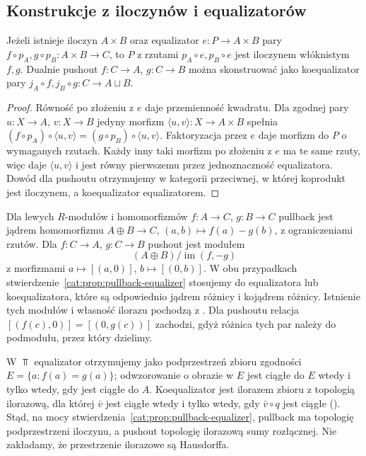 \subsection{Konstrukcje z iloczynów i equalizatorów}

\begin{stwierdzenie}\label{cat:prop:pullback-equalizer}
Jeżeli istnieje iloczyn $A\times B$ oraz equalizator $e:P\to A\times B$ pary $f\circ p_A,g\circ p_B:A\times B\to C$, to $P$ z rzutami $p_A\circ e,p_B\circ e$ jest iloczynem włóknistym $f,g$. Dualnie pushout $f:C\to A$, $g:C\to B$ można skonstruować jako koequalizator pary $j_A\circ f,j_B\circ g:C\to A\sqcup B$.
\end{stwierdzenie}
\begin{proof}
Równość po złożeniu z $e$ daje przemienność kwadratu. Dla zgodnej pary $u:X\to A$, $v:X\to B$ jedyny morfizm $\langle u,v\rangle:X\to A\times B$ spełnia $(f\circ p_A)\circ\langle u,v\rangle=(g\circ p_B)\circ\langle u,v\rangle$. Faktoryzacja przez $e$ daje morfizm do $P$ o wymaganych rzutach. Każdy inny taki morfizm po złożeniu z $e$ ma te same rzuty, więc daje $\langle u,v\rangle$ i jest równy pierwszemu przez jednoznaczność equalizatora. Dowód dla pushoutu otrzymujemy w kategorii przeciwnej, w której koprodukt jest iloczynem, a koequalizator equalizatorem.
\end{proof}

\begin{przyklad}[Moduły]\label{cat:ex:module-pull-push}
Dla lewych $R$-modułów i homomorfizmów $f:A\to C$, $g:B\to C$ pullback jest jądrem homomorfizmu $A\oplus B\to C$, $(a,b)\mapsto f(a)-g(b)$, z ograniczeniami rzutów. Dla $f:C\to A$, $g:C\to B$ pushout jest modułem
\[
(A\oplus B)/\operatorname{im}(f,-g)
\]
z morfizmami $a\mapsto[(a,0)]$, $b\mapsto[(0,b)]$. W obu przypadkach stwierdzenie~\ref{cat:prop:pullback-equalizer} stosujemy do equalizatora lub koequalizatora, które są odpowiednio jądrem różnicy i kojądrem różnicy. Istnienie tych modułów i własność ilorazu pochodzą z . Dla pushoutu relacja $[(f(c),0)]=[(0,g(c))]$ zachodzi, gdyż różnica tych par należy do podmodułu, przez który dzielimy.
\end{przyklad}

\begin{przyklad}[Topologia]\label{cat:ex:top-pull-push}
W $\Top$ equalizator otrzymujemy jako podprzestrzeń zbioru zgodności $E=\{a:f(a)=g(a)\}$; odwzorowanie o obrazie w $E$ jest ciągłe do $E$ wtedy i tylko wtedy, gdy jest ciągłe do $A$. Koequalizator jest ilorazem zbioru z topologią ilorazową, dla której $\bar v$ jest ciągłe wtedy i tylko wtedy, gdy $\bar v\circ q$ jest ciągłe (). Stąd, na mocy stwierdzenia~\ref{cat:prop:pullback-equalizer}, pullback ma topologię podprzestrzeni iloczynu, a pushout topologię ilorazową sumy rozłącznej. Nie zakładamy, że przestrzenie ilorazowe są Hausdorffa.
\end{przyklad}

